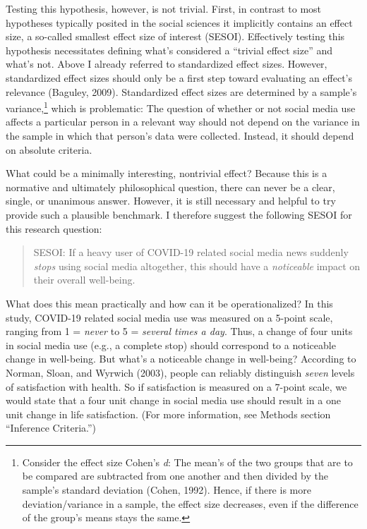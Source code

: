 \documentclass[
  english,
  man,mask,floatsintext]{apa6}
\begin{document}
Testing this hypothesis, however, is not trivial.
First, in contrast to most hypotheses typically posited in the social sciences it implicitly contains an effect size, a so-called smallest effect size of interest (SESOI).
Effectively testing this hypothesis necessitates defining what's considered a ``trivial effect size'' and what's not.
Above I already referred to standardized effect sizes.
However, standardized effect sizes should only be a first step toward evaluating an effect's relevance (Baguley, 2009).
Standardized effect sizes are determined by a sample's variance,\footnote{Consider the effect size Cohen's \emph{d}: The mean's of the two groups that are to be compared are subtracted from one another and then divided by the sample's standard deviation (Cohen, 1992). Hence, if there is more deviation/variance in a sample, the effect size decreases, even if the difference of the group's means stays the same.} which is problematic:
The question of whether or not social media use affects a particular person in a relevant way should not depend on the variance in the sample in which that person's data were collected.
Instead, it should depend on absolute criteria.

What could be a minimally interesting, nontrivial effect?
Because this is a normative and ultimately philosophical question, there can never be a clear, single, or unanimous answer.
However, it is still necessary and helpful to try provide such a plausible benchmark.
I therefore suggest the following SESOI for this research question:

\begin{quote}
SESOI: If a heavy user of COVID-19 related social media news suddenly \emph{stops} using social media altogether, this should have a \emph{noticeable} impact on their overall well-being.
\end{quote}

What does this mean practically and how can it be operationalized?
In this study, COVID-19 related social media use was measured on a 5-point scale, ranging from 1 = \emph{never} to 5 = \emph{several times a day}.
Thus, a change of four units in social media use (e.g., a complete stop) should correspond to a noticeable change in well-being.
But what's a noticeable change in well-being?
According to Norman, Sloan, and Wyrwich (2003), people can reliably distinguish \emph{seven} levels of satisfaction with health.
So if satisfaction is measured on a 7-point scale, we would state that a four unit change in social media use should result in a one unit change in life satisfaction.
(For more information, see Methods section ``Inference Criteria.'')
\end{document}
